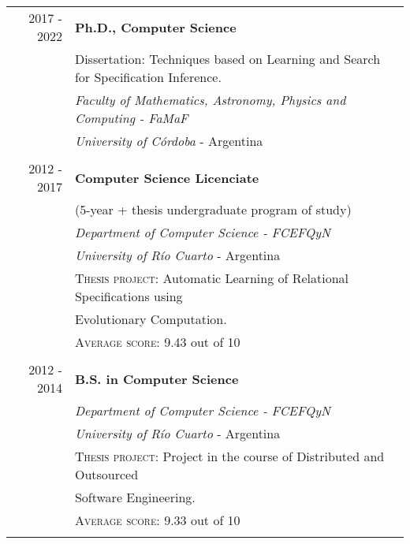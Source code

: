 \documentclass[a4paper,10pt]{article} %
\begin{document}
\begin{tabular}{rl}
\\
\textsc{2017 - 2022}	& \textbf{Ph.D., Computer Science} \\
& Dissertation: Techniques based on Learning and Search for Specification Inference. \\
& \textit{Faculty of Mathematics, Astronomy, Physics and Computing - FaMaF} \\ & \textit{University of Córdoba} - Argentina \\ & \\

\textsc{2012 - 2017}	& \textbf{Computer Science Licenciate} \\
& (5-year + thesis undergraduate program of study) \\
& \textit{Department of Computer Science - FCEFQyN} \\ & \textit{University of Río Cuarto} - Argentina \\ 
& \textsc{Thesis project:} Automatic Learning of Relational Specifications using \\ 
& Evolutionary Computation. \\ 
& \textsc{Average score:} 9.43 out of 10 \\ & \\

\textsc{2012 - 2014}	& \textbf{B.S. in Computer Science} \\
& \textit{Department of Computer Science - FCEFQyN} \\ 
& \textit{University of Río Cuarto} - Argentina \\
& \textsc{Thesis project:} Project in the course of Distributed and Outsourced \\ 
& Software Engineering. \\ 
& \textsc{Average score:} 9.33 out of 10 \\ \\ 

\end{tabular}
\end{document}
